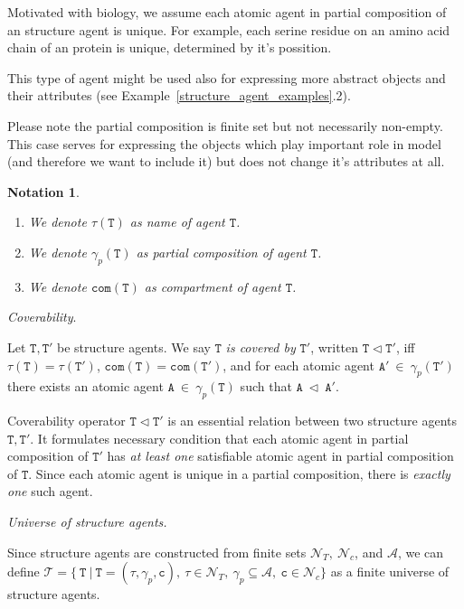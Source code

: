 \documentclass{elsarticle}
\newtheorem{notation}{Notation}
\begin{document}
Motivated with biology, we assume each atomic agent in partial composition of an structure agent is unique. For example, each serine residue on an amino acid chain of an protein is unique, determined by it's possition.

This type of agent might be used also for expressing more abstract objects and their attributes (see Example~\ref{structure_agent_examples}.2).

Please note the partial composition is finite set but not necessarily non-empty. This case serves for expressing the objects which play important role in model (and therefore we want to include it) but does not change it's attributes at all.

\begin{notation}
~

\begin{enumerate}
\item We denote $\tau(\mathtt{T})$ as name of agent $\mathtt{T}$.
\item We denote $\gamma_p(\mathtt{T})$ as partial composition of agent $\mathtt{T}$.
\item We denote $\mathtt{com}(\mathtt{T})$ as compartment of agent $\mathtt{T}$.
\end{enumerate}
\end{notation}

\begin{definition}
\textit{Coverability}.  

Let $\mathtt{T},\mathtt{T}'$ be structure agents. We say $\mathtt{T}$ \emph{is covered by} $\mathtt{T}'$, written $\mathtt{T} \lhd \mathtt{T}'$, iff $\tau(\mathtt{T}) = \tau(\mathtt{T'})$, $\mathtt{com}(\mathtt{T}) = \mathtt{com}(\mathtt{T'})$, and for each atomic agent $\mathtt{A}'~\in~\gamma_p(\mathtt{T'})$ there exists an atomic agent $\mathtt{A}~\in~\gamma_p(\mathtt{T})$ such that $\mathtt{A}~\lhd~\mathtt{A}'$. 
\end{definition} 

Coverability operator $\mathtt{T} \lhd \mathtt{T}'$ is an essential relation between two structure agents $\mathtt{T},\mathtt{T}'$. It formulates necessary condition that each atomic agent in partial composition of $\mathtt{T'}$ has \emph{at least one} satisfiable atomic agent in partial composition of $\mathtt{T}$. Since each atomic agent is unique in a partial composition, there is \emph{exactly one} such agent. 

\begin{definition}
\textit{Universe of structure agents.}  

\noindent Since structure agents are constructed from finite sets $\mathcal{N}_{T},~\mathcal{N}_{c}$, and $\mathcal{A}$, we can define  $\mathcal{T} = \{~\mathtt{T}~|~\mathtt{T} = (\tau, \gamma_p, \mathtt{c}),~\tau \in \mathcal{N}_{T},~\gamma_p \subseteq \mathcal{A},~\mathtt{c} \in \mathcal{N}_{c} \}$ as a finite universe of structure agents.
\end{definition}
\end{document}
